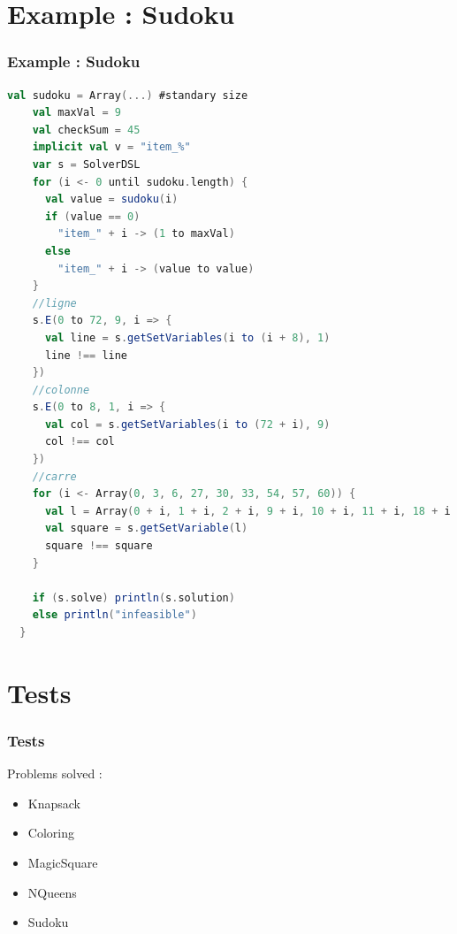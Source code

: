 \documentclass[usenames,dvipsnames]{beamer}
\begin{document}
\section{Example : Sudoku}
\begin{frame}[fragile]
\frametitle{Example : Sudoku}
\begin{lstlisting}[language=scala]
    val sudoku = Array(...) #standary size
    val maxVal = 9
    val checkSum = 45
    implicit val v = "item_%"
    var s = SolverDSL
    for (i <- 0 until sudoku.length) {
      val value = sudoku(i)
      if (value == 0) 
        "item_" + i -> (1 to maxVal)
      else 
        "item_" + i -> (value to value)
    }
    //ligne
    s.E(0 to 72, 9, i => {
      val line = s.getSetVariables(i to (i + 8), 1)
      line !== line
    })
    //colonne
    s.E(0 to 8, 1, i => {
      val col = s.getSetVariables(i to (72 + i), 9)
      col !== col
    })
    //carre
    for (i <- Array(0, 3, 6, 27, 30, 33, 54, 57, 60)) {
      val l = Array(0 + i, 1 + i, 2 + i, 9 + i, 10 + i, 11 + i, 18 + i, 19 + i, 20 + i)
      val square = s.getSetVariable(l)
      square !== square
    }

    if (s.solve) println(s.solution)
    else println("infeasible")
  }
\end{lstlisting}
\end{frame}


\section{Tests}
\begin{frame}
\frametitle{Tests}
Problems solved : 
\begin{itemize}
\item Knapsack
\item Coloring
\item MagicSquare
\item NQueens
\item Sudoku
\end{itemize}
\end{frame}
\end{document}
